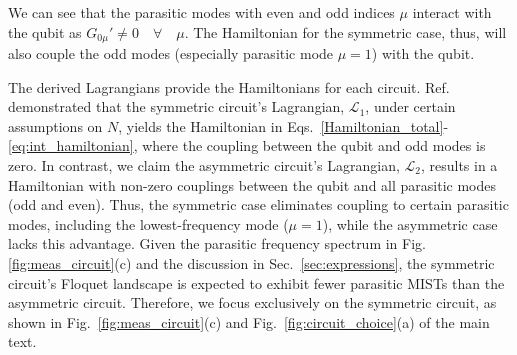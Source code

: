 \documentclass[%
reprint,
superscriptaddress,
 amsmath,amssymb,
 aps,
 prx,
longbibliography,
floatfix,
]{revtex4-2}
\begin{document}
We can see that the parasitic modes with even and odd indices $\mu$ interact with the qubit as $G_{0\mu}'\neq 0\quad \forall\quad\mu$. The Hamiltonian for the symmetric case, thus, will also couple the odd modes (especially  parasitic mode $\mu=1$) with the qubit. 

The derived Lagrangians provide the Hamiltonians for each circuit. Ref.~\cite{viola2015collective} demonstrated that the symmetric circuit's Lagrangian, \( \mathcal{L}_1 \), under certain assumptions on \( N \), yields the Hamiltonian in Eqs.~\ref{Hamiltonian_total}-\ref{eq:int_hamiltonian}, where the coupling between the qubit and odd modes is zero. In contrast, we claim the asymmetric circuit's Lagrangian, \( \mathcal{L}_2 \), results in a Hamiltonian with non-zero couplings between the qubit and all parasitic modes (odd and even). Thus, the symmetric case eliminates coupling to certain parasitic modes, including the lowest-frequency mode (\( \mu = 1 \)), while the asymmetric case lacks this advantage. Given the parasitic frequency spectrum in Fig. \ref{fig:meas_circuit}(c) and the discussion in Sec.~\ref{sec:expressions}, the symmetric circuit's Floquet landscape is expected to exhibit fewer parasitic MISTs than the asymmetric circuit. Therefore, we focus exclusively on the symmetric circuit, as shown in Fig.~\ref{fig:meas_circuit}(c) and Fig.~\ref{fig:circuit_choice}(a) of the main text.


\end{document}
